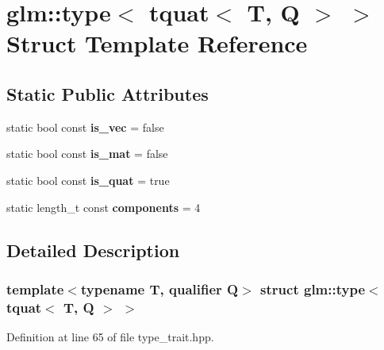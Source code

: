 \hypertarget{structglm_1_1type_3_01tquat_3_01T_00_01Q_01_4_01_4}{}\section{glm\+:\+:type$<$ tquat$<$ T, Q $>$ $>$ Struct Template Reference}
\label{structglm_1_1type_3_01tquat_3_01T_00_01Q_01_4_01_4}
\subsection*{Static Public Attributes}
\begin{DoxyCompactItemize}
\item 
\mbox{\label{structglm_1_1type_3_01tquat_3_01T_00_01Q_01_4_01_4_a512e63470e03e15c743282a72c0798f3}} 
static bool const {\bfseries is\+\_\+vec} = false
\item 
\mbox{\label{structglm_1_1type_3_01tquat_3_01T_00_01Q_01_4_01_4_ae80840fbe701f0ada0f430b4e1dae9f1}} 
static bool const {\bfseries is\+\_\+mat} = false
\item 
\mbox{\label{structglm_1_1type_3_01tquat_3_01T_00_01Q_01_4_01_4_ad8a07885504f8eb9d56e1cfbdbc10a68}} 
static bool const {\bfseries is\+\_\+quat} = true
\item 
\mbox{\label{structglm_1_1type_3_01tquat_3_01T_00_01Q_01_4_01_4_a4b2822c2e37012f219864ba5c49e1210}} 
static length\+\_\+t const {\bfseries components} = 4
\end{DoxyCompactItemize}


\subsection{Detailed Description}
\subsubsection*{template$<$typename T, qualifier Q$>$\newline
struct glm\+::type$<$ tquat$<$ T, Q $>$ $>$}



Definition at line 65 of file type\+\_\+trait.\+hpp.



